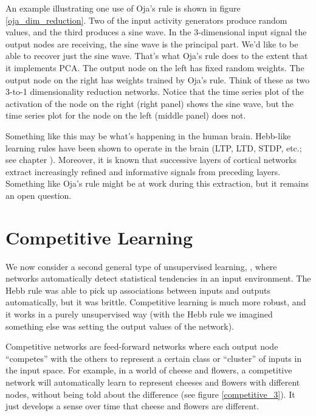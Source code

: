 An example illustrating one use of Oja's rule is shown in figure \ref{oja_dim_reduction}. Two of the input activity generators produce random values, and the third produces a sine wave. In the 3-dimensional input signal the output nodes are receiving, the sine wave is the principal part. We'd like to be able to recover just the sine wave. That's what Oja's rule does to the extent that it implements PCA. The output node on the left has fixed random weights. The output node on the right has weights trained by Oja's rule. Think of these as two 3-to-1 dimensionality reduction networks. Notice that the time series plot of the activation of the node on the right (right panel) shows the sine wave, but the time series plot for the node on the left (middle panel) does not.

Something like this may be what's happening in the human brain. Hebb-like learning rules have been shown to operate in the brain (LTP, LTD, STDP, etc.; see chapter ). Moreover, it is known that successive layers of cortical networks extract increasingly refined and informative signals from preceding layers. Something like Oja's rule might be at work during this extraction, but it remains an open question.


\section{Competitive Learning}


We now consider a second general type of unsupervised learning, , where networks automatically detect statistical tendencies in an input environment. The Hebb rule was able to pick up associations between inputs and outputs automatically, but it was brittle. Competitive learning is much more robust, and it works in a purely unsupervised way (with the Hebb rule we imagined something else was setting the output values of the network).

Competitive networks are feed-forward networks where each output node ``competes'' with the others to represent a certain class or ``cluster'' of inputs in the input space. For example, in a world of cheese and flowers, a competitive network will automatically learn to represent cheeses and flowers with different nodes, without being told about the difference  (see figure \ref{competitive_3}). It just develops a sense over time that cheese and flowers are different. 

